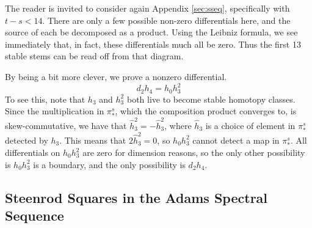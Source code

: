 The reader is invited to consider again Appendix \ref{sec:sseq}, specifically with $t-s<14$.
There are only a few possible non-zero differentials here, and the source of each be decomposed as a product.  
Using the Leibniz formula, we see immediately that, in fact, these differentials much all be zero.
Thus the first 13 stable stems can be read off from that diagram.

By being a bit more clever, we prove a nonzero differential.
\[d_2h_4=h_0h_3^2\]
To see this, note that $h_3$ and $h_3^2$ both live to become stable homotopy classes.
Since the multiplication in $\pi^s_*$, which the composition product converges to, is skew-commutative, we have that $\hat{h}_3^2=-\hat{h}_3^2$, where $\hat{h}_3$ is a choice of element in $\pi_*^s$ detected by $h_3$.  
This means that $2\hat{h}_3^2=0$, so $h_0h_3^2$ cannot detect a map in $\pi_*^s$.  
All differentials on $h_0h_3^2$ are zero for dimension reasons, so the only other possibility is $h_0h_3^2$ is a boundary, and the only possibility is $d_2h_4$.  



\subsection{Steenrod Squares in the Adams Spectral Sequence}

